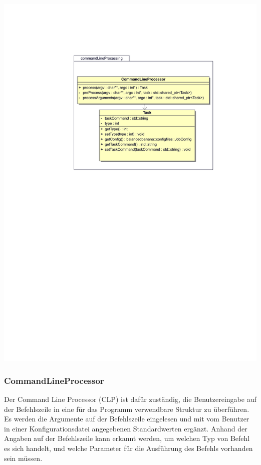 \documentclass[a4paper,12pt]{article}
\begin{document}
\includegraphics[width=\textwidth]{CommandLineProcessing}

\subsubsection{CommandLineProcessor}

Der Command Line Processor (CLP) ist dafür zuständig, die Benutzereingabe auf der Befehlszeile in eine für das Programm verwendbare Struktur zu überführen. Es werden die Argumente auf der Befehlszeile eingelesen und mit vom Benutzer in einer Konfigurationsdatei angegebenen Standardwerten ergänzt. Anhand der Angaben auf der Befehlszeile kann erkannt werden, um welchen Typ von Befehl es sich handelt, und welche Parameter für die Ausführung des Befehls vorhanden sein müssen.
\end{document}
